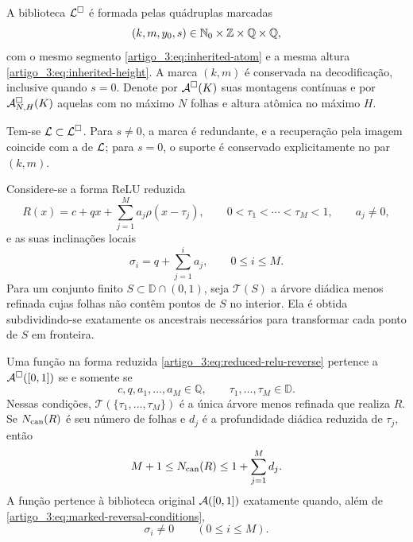 \begin{definition}\label{map:artigo_3:5.1}
\label{artigo_3:def:marked-completion}
A biblioteca $\mathcal{L}^\square$ é formada pelas quádruplas marcadas
\begin{equation}
 (k,m,y_0,s)\in\mathbb{N}_0\times\mathbb Z\times\mathbb Q\times\mathbb Q,
 \label{artigo_3:eq:marked-atoms}
\end{equation}
com o mesmo segmento \eqref{artigo_3:eq:inherited-atom} e a mesma altura
\eqref{artigo_3:eq:inherited-height}. A marca $(k,m)$ é conservada na decodificação,
inclusive quando $s=0$. Denote por $\mathcal{A}^\square(K)$ suas montagens
contínuas e por $\mathcal{A}^\square_{N,H}(K)$ aquelas com no máximo $N$
folhas e altura atômica no máximo $H$.
\end{definition}

Tem-se $\mathcal{L}\subset\mathcal{L}^\square$. Para $s\ne0$, a marca é redundante,
e a recuperação pela imagem coincide com a de $\mathcal{L}$; para $s=0$, o
suporte é conservado explicitamente no par $(k,m)$.

Considere-se a forma ReLU reduzida
\begin{equation}
 R(x)=c+qx+\sum_{j=1}^{M}a_j\rho(x-\tau_j),
 \qquad 0<\tau_1<\cdots<\tau_M<1,
 \qquad a_j\ne0,
 \label{artigo_3:eq:reduced-relu-reverse}
\end{equation}
e as suas inclinações locais
\begin{equation}
 \sigma_i=q+\sum_{j=1}^{i}a_j,
 \qquad 0\le i\le M.
 \label{artigo_3:eq:reverse-local-slopes}
\end{equation}
Para um conjunto finito $S\subset\mathbb D\cap(0,1)$, seja
$\mathcal T(S)$ a árvore diádica menos refinada cujas folhas não contêm
pontos de $S$ no interior. Ela é obtida subdividindo-se exatamente os ancestrais
necessários para transformar cada ponto de $S$ em fronteira.

\begin{theorem}\label{map:artigo_3:5.2}
\label{artigo_3:thm:exact-marked-reversal}
Uma função na forma reduzida \eqref{artigo_3:eq:reduced-relu-reverse} pertence a
$\mathcal{A}^\square([0,1])$ se e somente se
\begin{equation}
 c,q,a_1,\ldots,a_M\in\mathbb Q,
 \qquad
 \tau_1,\ldots,\tau_M\in\mathbb D.
 \label{artigo_3:eq:marked-reversal-conditions}
\end{equation}
Nessas condições, $\mathcal T(\{\tau_1,\ldots,\tau_M\})$ é a única árvore
menos refinada que realiza $R$. Se $N_{\rm can}(R)$ é seu número de folhas e
$d_j$ é a profundidade diádica reduzida de $\tau_j$, então
\begin{equation}
 M+1\le N_{\rm can}(R)
 \le 1+\sum_{j=1}^{M}d_j.
 \label{artigo_3:eq:canonical-tree-leaf-bounds}
\end{equation}
A função pertence à biblioteca original $\mathcal{A}([0,1])$ exatamente quando,
além de \eqref{artigo_3:eq:marked-reversal-conditions},
\begin{equation}
 \sigma_i\ne0\qquad(0\le i\le M).
 \label{artigo_3:eq:original-nonflat-condition}
\end{equation}
\end{theorem}

